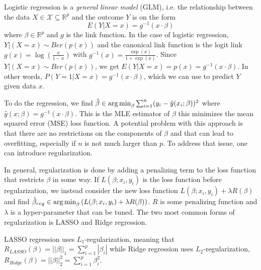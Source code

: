 \documentclass[../../project.tex]{subfiles}
\begin{document}
	Logistic regression is a \textit{general linear model} (GLM), i.e. the relationship between the data $X \in \mathcal{X} \subseteq \mathbb{R}^p$ and the outcome $Y$ is on the form
	\begin{equation}
	E(Y|X=x) = g^{-1}(x \cdot \beta)
	\end{equation}
	where $\beta \in \mathbb{R}^p$ and $g$ is the link function. In the case of logistic regression, $Y|(X = x) \sim Ber(p(x))$ and the canonical link function is the logit link $g(x) = \log \left( \frac{x}{1 - x} \right)$ with $g^{-1}(x) = \frac{\exp(x)}{1 + \exp(x)}$. Since $Y|(X=x) \sim Ber(p(x))$, we get $E(Y|X=x) = p(x) = g^{-1}(x \cdot \beta)$. In other words, $P(Y = 1 | X = x) = g^{-1}(x \cdot \beta)$, which we can use to predict $Y$ given data $x$.
	
	To do the regression, we find $\hat \beta \in \operatorname*{arg\,min}_\beta \sum_{i=1}^{n} (y_i - \hat y(x_i; \beta))^2$ where $\hat y(x;\beta) = g^{-1} (x \cdot \beta)$. This is the MLE estimator of $\beta$ this minimizes the mean squared error (MSE) loss function. A potential problem with this approach is that there are no restrictions on the components of $\beta$ and that can lead to overfitting, especially if $n$ is not much larger than $p$. To address that issue, one can introduce regularization.
	
	In general, regularization is done by adding a penalizing term to the loss function that restricts $\beta$ in some way. If $L(\beta; x_i,y_i)$ is the loss function before regularization, we instead consider the new loss function $L(\beta; x_i,y_i) + \lambda R(\beta)$ and find $\hat \beta_{reg} \in \operatorname*{arg\,min}_\beta \left( L(\beta; x_i, y_i) + \lambda R(\beta) \right)$. $R$ is some penalizing function and $\lambda$ is a hyper-parameter that can be tuned. The two most common forms of regularization is LASSO and Ridge regression.
	
	LASSO regression uses $L_1$-regularization, meaning that $R_{LASSO}(\beta) = ||\beta||_1 =  \sum_{i=1}^{p} |\beta_i|$ while Ridge regression uses $L_2$-regularization, $R_{Ridge}(\beta) = ||\beta||_2^2 = \sum_{i=1}^{p} \beta_i^2$.
	
\end{document}
